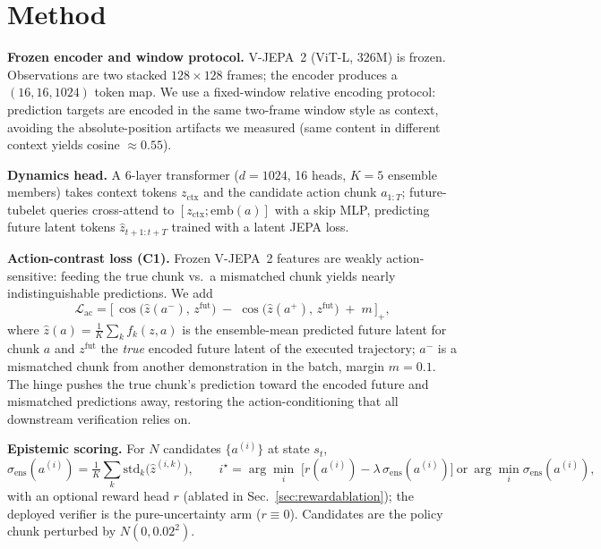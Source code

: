 \documentclass[11pt]{article}
\newcommand{\std}{\sigma_{\mathrm{ens}}}
\begin{document}
\section{Method}
\label{sec:method}
\textbf{Frozen encoder and window protocol.} V-JEPA~2 (ViT-L, 326M) is frozen. Observations are two stacked $128{\times}128$ frames; the encoder produces a $(16,16,1024)$ token map. We use a fixed-window relative encoding protocol: prediction targets are encoded in the same two-frame window style as context, avoiding the absolute-position artifacts we measured (same content in different context yields cosine $\approx 0.55$).

\textbf{Dynamics head.} A 6-layer transformer ($d{=}1024$, 16 heads, $K{=}5$ ensemble members) takes context tokens $z_{\mathrm{ctx}}$ and the candidate action chunk $a_{1:T}$; future-tubelet queries cross-attend to $[z_{\mathrm{ctx}}; \mathrm{emb}(a)]$ with a skip MLP, predicting future latent tokens $\hat z_{t+1:t+T}$ trained with a latent JEPA loss.

\textbf{Action-contrast loss (C1).} Frozen V-JEPA~2 features are weakly action-sensitive: feeding the true chunk vs.\ a mismatched chunk yields nearly indistinguishable predictions. We add
\begin{equation}
\mathcal{L}_{\mathrm{ac}} = \big[\, \cos\!\big(\hat z(a^-),\, z^{\mathrm{fut}}\big) \;-\; \cos\!\big(\hat z(a^+),\, z^{\mathrm{fut}}\big) \;+\; m \,\big]_+,
\end{equation}
where $\hat z(a) = \tfrac1K\sum_k f_k(z, a)$ is the ensemble-mean predicted future latent for chunk $a$ and $z^{\mathrm{fut}}$ the \emph{true} encoded future latent of the executed trajectory; $a^-$ is a mismatched chunk from another demonstration in the batch, margin $m=0.1$. The hinge pushes the true chunk's prediction toward the encoded future and mismatched predictions away, restoring the action-conditioning that all downstream verification relies on.

\textbf{Epistemic scoring.} For $N$ candidates $\{a^{(i)}\}$ at state $s_t$,
\begin{equation}
\std(a^{(i)}) = \tfrac{1}{K}\textstyle\sum_k \mathrm{std}_k\big(\hat z^{(i,k)}\big), \qquad
i^\star = \arg\min_i \; \big[ r(a^{(i)}) - \lambda\, \std(a^{(i)}) \big]\ \text{or}\ \arg\min_i \std(a^{(i)}),
\end{equation}
with an optional reward head $r$ (ablated in Sec.~\ref{sec:rewardablation}); the deployed verifier is the pure-uncertainty arm ($r\equiv 0$). Candidates are the policy chunk perturbed by $N(0, 0.02^2)$.
\end{document}
